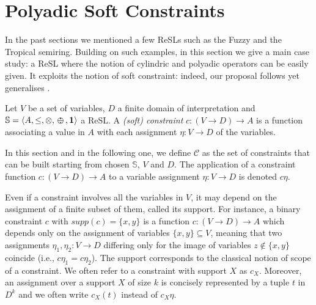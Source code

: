 \documentclass{llncs}
\def\monid{{\mathbf 0}}
\def\monop{\otimes}
\def\odiv{\, {\ominus\hspace{-7.7pt} \div} \,}
\def\monid{\mathbf{1}}
\begin{document}

\section{Polyadic Soft Constraints}\label{sec:softconstraints}
\label{subsec:inst} 
In the past sections we mentioned a few ReSLs such as 
the Fuzzy 
and the Tropical semiring.
%
Building on such examples, in this section we give a main case study: a ReSL 
where the notion of cylindric and polyadic operators can be easily given.
It exploits the notion
of soft constraint: indeed, our proposal follows yet generalises \cite{scc}.

\begin{definition}\label{def:softconstraints}
	Let $V$ be a set of variables, $D$ a finite domain of interpretation
	and ${\mathbb S} = \langle A, \leq, \monop, \odiv, \monid \rangle$ a ReSL.
	A \emph{(soft) constraint} $c: (V \rightarrow D) \rightarrow
	A$ is a function associating a value in $A$ with each assignment
	$\eta: V\rightarrow D$ of the variables.
\end{definition}

In this section and in the following one, we define $\mathcal{C}$ as the set of constraints that can be
built starting from chosen $\mathbb S$, $V$ and $D$. The application of a
constraint function $c:(V \rightarrow D) \rightarrow A$ to a variable
assignment $\eta:V\rightarrow D$ is denoted $c\eta$.  

Even if
a constraint involves all the variables in $V$, it may depend on
the assignment of a finite subset of them, called its support. For
instance, a binary constraint $c$ with $supp(c)=\{x,y\}$ is a function
$c: (V\rightarrow D)\rightarrow A$ which depends only on the
assignment of variables $\{x,y\}\subseteq V$, meaning that two
assignments $\eta_1, \eta_2: V \rightarrow D$ differing only for the
image of variables $z \not \in \{x,y\}$ coincide (i.e., $c\eta_1 =
c\eta_2$).
%
The support corresponds to the classical notion of scope of a
constraint.  We often refer to a constraint with support $X$ as $c_X$.
Moreover, an assignment over a support $X$ of size $k$ is concisely
represented by a tuple $t$ in $D^k$ and we often write $c_X(t)$
instead of $c_X\eta$.
\end{document}
